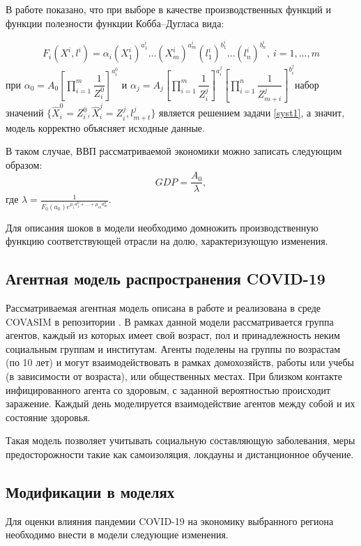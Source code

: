 \documentclass[12pt, a4paper]{article}
\begin{document}
В работе \cite{Inverse_Shan} показано, что при выборе в качестве производственных функций и функции полезности функции Кобба--Дугласа вида:

$$
F_i(X^i, l^i) = \alpha_i(X^i_1)^{a_1^i}\ldots (X_m^i)^{a^i_m}(l^i_1)^{b^i_1}\ldots(l_n^i)^{b^i_n},\ i=1,\ldots,m
$$
при $\alpha_0 = A_0\left[\prod\limits_{i=1}^m\dfrac{1}{Z^0_i}\right]^{a^0_i}$ и $\alpha_j = A_j\left[\prod\limits_{i=1}^m\dfrac{1}{Z^j_i}\right]^{a^j_i}\left[\prod\limits_{i=1}^n\dfrac{1}{Z^j_{m+i}}\right]^{b^j_i}$набор значений $\{\hat{X}^0_i = Z^0_i, \hat{X}^j_i=Z^j_i, l^j_{m+t}\}$ является решением задачи \eqref{syst1}, а значит, модель корректно объясняет исходные данные.

В таком случае, ВВП рассматриваемой экономики можно записать следующим образом:
$$
GDP = \dfrac{A_0}{\lambda},
$$
где $\lambda = \frac{1}{F_0(a_0)e^{\mu_1a^0_1 + \ldots + \mu_m a^0_m}}$.

Для описания шоков в модели необходимо домножить производственную функцию соответствующей отрасли на долю, характеризующую изменения.

\subsection{Агентная модель распространения COVID-19}

Рассматриваемая агентная модель описана в работе \cite{COVID_model} и реализована в среде COVASIM в репозитории \cite{COVID_code}. В рамках данной модели рассматривается группа агентов, каждый из которых имеет свой возраст, пол и принадлежность неким социальным группам и институтам. Агенты поделены на группы по возрастам (по 10 лет) и могут взаимодействовать в рамках домохозяйств, работы или учебы (в зависимости от возраста), или общественных местах. При близком контакте инфицированного агента со здоровым, с заданной вероятностью происходит заражение.
Каждый день моделируется взаимодействие агентов между собой и их состояние здоровья.

Такая модель позволяет учитывать социальную составляющую заболевания, меры предосторожности такие как самоизоляция, локдауны и дистанционное обучение.

\subsection{Модификации в моделях}

Для оценки влияния пандемии COVID-19 на экономику выбранного региона необходимо внести в модели следующие изменения.
\end{document}
